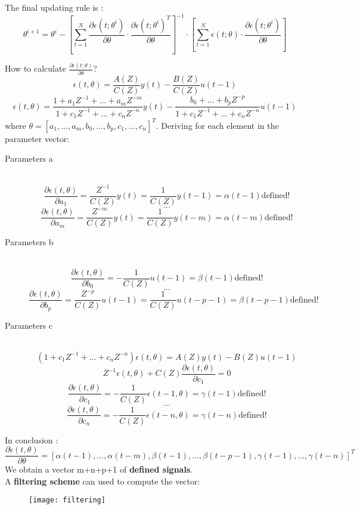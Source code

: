 The final updating rule is :
\[
\boxed{\theta^{i+1} = \theta^i - \left[ \sum\limits_{t=1}^{N} \frac{\partial \epsilon(t;\theta^i)}{\partial{\theta}} \cdot \frac{\partial \epsilon(t;\theta^i)^T}{\partial{\theta}} \right]^{-1} \cdot  \left[ \sum\limits_{t=1}^{N} \epsilon(t;\theta) \cdot \frac{\partial \epsilon(t;\theta^i)}{\partial{\theta}} \right]}
\]

How to calculate $\frac{\partial \epsilon(t;\theta)}{\partial{\theta}}$?\\
$$\epsilon(t,\theta)= \frac{A(Z)}{C(Z)}y(t) - \frac{B(Z)}{C(Z)}u(t-1)$$
$$ \epsilon(t,\theta)= \frac{1+a_1Z^{-1}+...+a_mZ^{-m}}{1+c_1Z^{-1}+...+c_nZ^{-n}} y(t) - \frac{b_0+...+b_pZ^{-p}}{1+c_1Z^{-1}+...+c_nZ^{-n}}u(t-1)$$
where $\theta =[a_1,...,a_m,b_0,...,b_p,c_1,...,c_n]^T$. Deriving for each element in the parameter vector:
\begin{description}
\item[Parameters a]\hfill\\
$$ \frac{\partial{\epsilon(t,\theta)}}{\partial{a_1}}= \frac{Z^{-1}}{C(Z)}y(t)=\frac{1}{C(Z)}y(t-1) = \alpha(t-1) \text{defined!}$$
$$ \text{...}$$
$$ \frac{\partial{\epsilon(t,\theta)}}{\partial{a_m}}= \frac{Z^{-m}}{C(Z)}y(t)=\frac{1}{C(Z)}y(t-m) = \alpha(t-m) \text{defined!}$$
\item[Parameters b]\hfill\\
$$ \frac{\partial{\epsilon(t,\theta)}}{\partial{b_0}}= -\frac{1}{C(Z)}u(t-1)= \beta(t-1) \text{defined!}$$
$$ \text{...}$$
$$ \frac{\partial{\epsilon(t,\theta)}}{\partial{b_p}}= \frac{Z^{-p}}{C(Z)}u(t-1)=\frac{1}{C(Z)}u(t-p-1) = \beta(t-p-1) \text{defined!}$$
\item[Parameters c]\hfill\\
$$ (1+c_1Z^{-1}+...+c_nZ^{-n})\epsilon(t,\theta)=A(Z)y(t)-B(Z)u(t-1)$$
$$ Z^{-1}\epsilon(t,\theta)+C(Z)\frac{\partial{\epsilon(t,\theta)}}{\partial{c_1}}=0$$
$$ \frac{\partial{\epsilon(t,\theta)}}{\partial{c_1}} = - \frac{1}{C(Z)}\epsilon(t-1,\theta)= \gamma(t-1) \text{defined!}$$
$$ \text{...}$$
$$ \frac{\partial{\epsilon(t,\theta)}}{\partial{c_n}} = - \frac{1}{C(Z)}\epsilon(t-n,\theta)= \gamma(t-n) \text{defined!} $$
\end{description}
In conclusion :
\[
\boxed{\frac{\partial{\epsilon(t,\theta)}}{\partial{\theta}}= [\alpha(t-1),...,\alpha(t-m),\beta(t-1),...,\beta(t-p-1),\gamma(t-1),...,\gamma(t-n)]^T}
\]
We obtain a vector m+n+p+1 of \textbf{defined signals}.\\
A \textbf{filtering scheme} can used to compute the vector:
\begin{figure}[H]
 \centering
  \texttt{[image: filtering]}
\end{figure}


